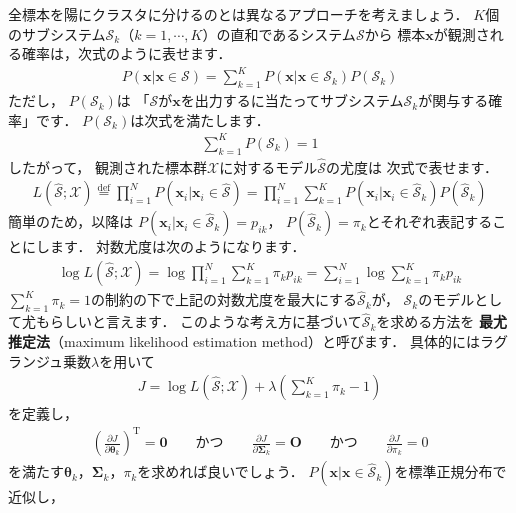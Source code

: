 ﻿\documentclass{jsarticle}
\begin{document}
全標本を陽にクラスタに分けるのとは異なるアプローチを考えましょう．
$K$個のサブシステム$\mathcal{S}_{k}$（$k=1,\cdots,K$）の直和であるシステム$\mathcal{S}$から
標本$\bm{x}$が観測される確率は，次式のように表せます．
\begin{align*}
P(\bm{x}|\bm{x}\in\mathcal{S})
=\sum_{k=1}^{K}P(\bm{x}|\bm{x}\in\mathcal{S}_{k})P(\mathcal{S}_{k})
\end{align*}
ただし，
$P(\mathcal{S}_{k})$は
「$\mathcal{S}$が$\bm{x}$を出力するに当たってサブシステム$\mathcal{S}_{k}$が関与する確率」です．
$P(\mathcal{S}_{k})$は次式を満たします．
\begin{align}
\sum_{k=1}^{K}P(\mathcal{S}_{k})=1
\label{eq:hiddenstate_sum}
\end{align}
したがって，
観測された標本群$\mathcal{X}$に対するモデル$\hat{\mathcal{S}}$の尤度は
次式で表せます．
\begin{align*}
L(\hat{\mathcal{S}};\mathcal{X})
\overset{\mathrm{def}}{=}
\prod_{i=1}^{N}P(\bm{x}_{i}|\bm{x}_{i}\in\hat{\mathcal{S}})
=\prod_{i=1}^{N}\sum_{k=1}^{K}P(\bm{x}_{i}|\bm{x}_{i}\in\hat{\mathcal{S}}_{k})P(\hat{\mathcal{S}}_{k})
\end{align*}
簡単のため，以降は
$P(\bm{x}_{i}|\bm{x}_{i}\in\hat{\mathcal{S}}_{k})=p_{ik}$，
$P(\hat{\mathcal{S}}_{k})=\pi_{k}$とそれぞれ表記することにします．
対数尤度は次のようになります．
\begin{align*}
\log L(\hat{\mathcal{S}};\mathcal{X})
=\log\prod_{i=1}^{N}\sum_{k=1}^{K}\pi_{k}p_{ik}
=\sum_{i=1}^{N}\log\sum_{k=1}^{K}\pi_{k}p_{ik}
\end{align*}
$\sum_{k=1}^{K}\pi_{k}=1$の制約の下で上記の対数尤度を最大にする$\hat{\mathcal{S}}_{k}$が，
$\mathcal{S}_{k}$のモデルとして尤もらしいと言えます．
このような考え方に基づいて$\hat{\mathcal{S}}_{k}$を求める方法を
{\bf 最尤推定法}（maximum likelihood estimation method）と呼びます．
具体的にはラグランジュ乗数$\lambda$を用いて
\begin{align*}
J=\log L(\hat{\mathcal{S}};\mathcal{X})+\lambda\left(\sum_{k=1}^{K}\pi_{k}-1\right)
\end{align*}
を定義し，
\begin{align*}
\left(\frac{\partial J}{\partial\bm{\theta}_{k}}\right)^{\mathrm{T}}=\bm{0}
\qquad\mbox{かつ}\qquad
\frac{\partial J}{\partial\bm{\Sigma}_{k}}=\bm{O}
\qquad\mbox{かつ}\qquad
\frac{\partial J}{\partial\pi_{k}}=0
\end{align*}
を満たす$\bm{\theta}_{k}$，$\bm{\Sigma}_{k}$，$\pi_{k}$を求めれば良いでしょう．
$P(\bm{x}|\bm{x}\in\hat{\mathcal{S}}_{k})$を標準正規分布で近似し，
\end{document}
